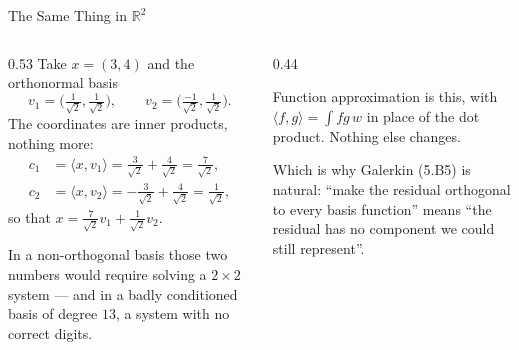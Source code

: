 \begin{frame}{The Same Thing in $\mathbb{R}^{2}$}
\begin{columns}[T]
\begin{column}{0.53\textwidth}
\small
Take $x=(3,4)$ and the orthonormal basis
\[
  v_1=\Big(\tfrac{1}{\sqrt2},\tfrac{1}{\sqrt2}\Big),\qquad
  v_2=\Big(\tfrac{-1}{\sqrt2},\tfrac{1}{\sqrt2}\Big).
\]
The coordinates are inner products, nothing more:
\begin{align*}
  c_1&=\langle x,v_1\rangle=\tfrac{3}{\sqrt2}+\tfrac{4}{\sqrt2}=\tfrac{7}{\sqrt2},\\
  c_2&=\langle x,v_2\rangle=-\tfrac{3}{\sqrt2}+\tfrac{4}{\sqrt2}=\tfrac{1}{\sqrt2},
\end{align*}
so that $x=\tfrac{7}{\sqrt2}v_1+\tfrac{1}{\sqrt2}v_2$.
\medskip

In a non-orthogonal basis those two numbers would require solving a $2\times2$ system --- and in a badly conditioned basis of degree $13$, a system with no correct digits.
\end{column}
\begin{column}{0.44\textwidth}
\begin{takeawaybox}\footnotesize
Function approximation is this, with $\langle f,g\rangle=\int f g\,w$ in place of the dot product. Nothing else changes.
\end{takeawaybox}
\medskip
\begin{examplebox}\footnotesize
Which is why Galerkin (5.B5) is natural: ``make the residual orthogonal to every basis function'' means ``the residual has no component we could still represent''.
\end{examplebox}
\end{column}
\end{columns}
\vspace{1mm}
\end{frame}

